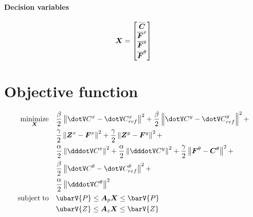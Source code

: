 \documentclass[a4paper]{article}
\begin{document}
\paragraph{Decision variables}

\begin{equation}
    \quad
    \V{X} = 
    \begin{bmatrix} 
        \dddot{\M{C}} \\
        \overline{\M{F}}^{x} \\
        \overline{\M{F}}^{y} \\
        \overline{\M{F}}^{\theta}
    \end{bmatrix}
    \quad
\end{equation}

\section*{Objective function}

\begin{equation}
\begin{split}
    \MINIMIZE{\M{X}}  & \frac{\beta}{2} \NORM{\cVel^{x} - \cVel^{x}_{ref}}^2 + \frac{\beta}{2} \NORM{\cVel^{y} - \cVel^{y}_{ref}}^2 + \\
                        & \frac{\gamma}{2}  \NORM{\CoP^{x} - \M{F}^{x}}^2 + \frac{\gamma}{2}  \NORM{\CoP^{y} - \M{F}^{y}}^2 +\\
                        & \frac{\alpha}{2} \NORM{\cJerk^{x}}^2 + \frac{\alpha}{2} \NORM{\cJerk^{y}}^2 + \frac{\gamma}{2} \NORM{\M{F}^{\theta} - \cPos^{\theta}}^2 +\\
                        & \frac{\beta}{2} \NORM{\cVel^{\theta} - \cVel^{\theta}_{ref}}^2 +\\
                        & \frac{\alpha}{2} \NORM{\cJerk^{\theta}}^2 \\
    \SUBJECTTO          & \ubarV{P} \le \M{A}_{p}\V{X} \le \barV{P} \\
                        & \ubarV{Z} \le \M{A}_{z}\V{X} \le \barV{Z}
\end{split}
\end{equation}
\end{document}
